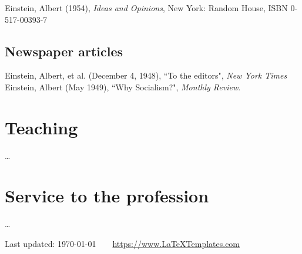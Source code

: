 \documentclass[11pt]{article} %
\begin{document}
Einstein, Albert (1954), \emph{Ideas and Opinions}, New York: Random House, ISBN 0-517-00393-7


\subsection*{Newspaper articles}

Einstein, Albert, et al. (December 4, 1948), “To the editors", \emph{New York Times}\\
Einstein, Albert (May 1949), “Why Socialism?", \emph{Monthly Review}.


\section*{Teaching}

\ldots


\section*{Service to the profession}

\ldots

\vfill %


\begin{center}
	\scriptsize
	Last updated: \today~~\raisebox{-0.5pt}{\textbullet}~~\href{https://www.LaTeXTemplates.com}{https://www.LaTeXTemplates.com}
\end{center}

\fi
\end{document}
